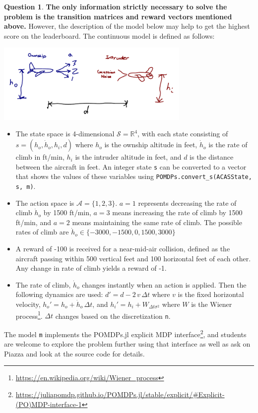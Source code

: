 \documentclass{article}
\theoremstyle{definition}
\newtheorem{question}[thm]{Question}
\newcommand{\reals}{\mathbb{R}}
\begin{document}
\begin{question}
\textbf{The only information strictly necessary to solve the problem is the transition matrices and reward vectors mentioned above.} However, the description of the model below may help to get the highest score on the leaderboard. The continuous model is defined as follows:

\begin{center}
    \includegraphics[width=0.7\textwidth]{unresponsive_acas.pdf}
\end{center}

\begin{itemize}
    \item The state space is 4-dimensional $\mathcal{S} = \reals^4$, with each state consisting of $s=(h_o, \dot{h}_o, h_i, d)$ where $h_o$ is the ownship altitude in feet, $\dot{h}_o$ is the rate of climb in ft/min, $h_i$ is the intruder altitude in feet, and $d$ is the distance between the aircraft in feet. An integer state \texttt{s} can be converted to a vector that shows the values of these variables using \texttt{POMDPs.convert\_s(ACASState, s, m)}.
    \item The action space is $\mathcal{A}=\{1,2,3\}$. $a=1$ represents decreasing the rate of climb $\dot{h}_o$ by 1500 ft/min, $a=3$ means increasing the rate of climb by 1500 ft/min, and $a=2$ means maintaining the same rate of climb. The possible rates of climb are $\dot{h}_o \in \{-3000, -1500, 0, 1500, 3000\}$
    \item A reward of -100 is received for a near-mid-air collision, defined as the aircraft passing within 500 vertical feet and 100 horizontal feet of each other. Any change in rate of climb yields a reward of -1.
    \item The rate of climb, $\dot{h}_o$ changes instantly when an action is applied. Then the following dynamics are used: $d' = d - 2\,v\,\Delta t$ where $v$ is the fixed horizontal velocity, $h_o' = h_o + \dot{h}_o\,\Delta t$, and $h_i' = h_i + W_{\Delta t \sigma^2}$ where $W$ is the Wiener process\footnote{\url{https://en.wikipedia.org/wiki/Wiener_process}}. $\Delta t$ changes based on the discretization \texttt{n}.
\end{itemize}

The model \texttt{m} implements the POMDPs.jl explicit MDP interface\footnote{\url{https://juliapomdp.github.io/POMDPs.jl/stable/explicit/\#Explicit-(PO)MDP-interface-1}}, and students are welcome to explore the problem further using that interface as well as ask on Piazza and look at the source code for details.

\end{question}
\end{document}
